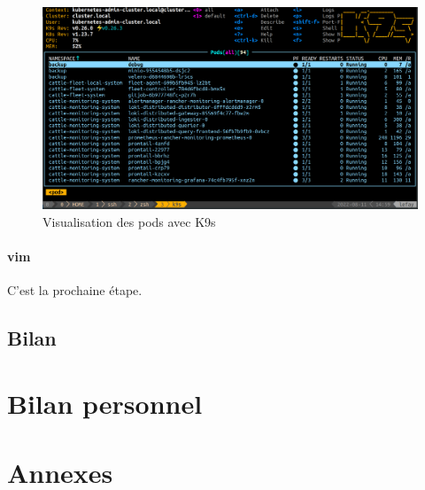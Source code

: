 \documentclass[12pt]{article}
\begin{document}
\begin{figure}[!ht]
    \centering
        \includegraphics[width=\textwidth]{src/interface_k9s.png}
    \caption{Visualisation des pods avec K9s}
    \label{fig:k9s}
\end{figure}

\paragraph{vim}
C'est la prochaine étape.

\newpage
\subsection{Bilan}

\newpage
\section{Bilan personnel}


\newpage
\section{Annexes}
\end{document}
